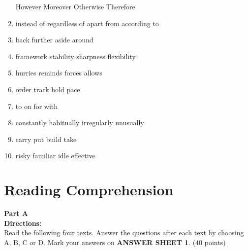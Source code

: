 \begin{enumerate}
\fourchoices
{However}
{Moreover}
{Otherwise}
{Therefore}




\item

\fourchoices
{instead of}
{regardless of}
{apart from}
{according to}


\item


\fourchoices
{back}
{further}
{aside}
{around}




\item

\fourchoices
{framework}
{stability}
{sharpness}
{flexibility}


\item


\fourchoices
{hurries}
{reminds}
{forces}
{allows}




\item


\fourchoices
{order}
{track}
{hold}
{pace}




\item


\fourchoices
{to}
{on}
{for}
{with}




\item

\fourchoices
{constantly}
{habitually}
{irregularly}
{unusually}



\item


\fourchoices
{carry}
{put}
{build}
{take}




\item


\fourchoices
{risky}
{familiar}
{idle}
{effective}

\end{enumerate}


\vfil

\section{Reading Comprehension}


\noindent
\textbf{Part A}\\
\textbf{Directions:}\\
 Read the following four texts. Answer the questions
	after each text by choosing A, B, C or
	D. Mark your answers on \textbf{ANSWER SHEET 1}. (40 points)

